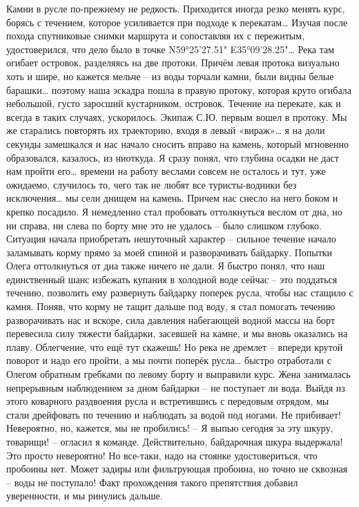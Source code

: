 Камни в русле по-прежнему не редкость. Приходится иногда резко менять курс, борясь с течением, которое усиливается при подходе к перекатам… Изучая после похода спутниковые снимки маршрута и сопоставляя их с пережитым, удостоверился, что дело было в точке N59°25'27.51" E35°09'28.25"… Река там огибает островок, разделяясь на две протоки. Причём левая протока визуально хоть и шире, но кажется мельче – из воды торчали камни, были видны белые барашки… поэтому наша эскадра пошла в правую протоку, которая круто огибала небольшой, густо заросший кустарником, островок. Течение на перекате, как и всегда в таких случаях, ускорилось. Экипаж С.Ю. первым вошел в протоку. Мы же старались повторять их траекторию, входя в левый «вираж»… я на доли секунды замешкался и нас начало сносить вправо на камень, который мгновенно образовался, казалось, из ниоткуда. Я сразу понял, что глубина осадки не даст нам пройти его… времени на работу веслами совсем не осталось и тут, уже ожидаемо, случилось то, чего так не любят все туристы-водники без исключения… мы сели днищем на камень. Причем нас снесло на него боком и крепко посадило. Я немедленно стал пробовать оттолкнуться веслом от дна, но ни справа, ни слева по борту мне это не удалось – было слишком глубоко. Ситуация начала приобретать нешуточный характер – сильное течение начало заламывать корму прямо за моей спиной и разворачивать байдарку. Попытки Олега оттолкнуться от дна также ничего не дали. Я быстро понял, что наш единственный шанс избежать купания в холодной воде сейчас – это поддаться течению, позволить ему развернуть байдарку поперек русла, чтобы нас стащило с камня. Поняв, что корму не тащит дальше под воду, я стал помогать течению разворачивать нас и вскоре, сила давления набегающей водной массы на борт перевесила силу тяжести байдарки, засевшей на камне, и мы вновь оказались на плаву. Облегчение, что ещё тут скажешь! Но река не дремлет – впереди крутой поворот и надо его пройти, а мы почти поперёк русла… быстро отработали с Олегом обратным гребками по левому борту и выправили курс. Жена занималась непрерывным наблюдением за дном байдарки – не поступает ли вода. Выйдя из этого коварного раздвоения русла и встретившись с передовым отрядом, мы стали дрейфовать по течению и наблюдать за водой под ногами. Не прибивает! Невероятно, но, кажется, мы не пробились! 
– Я выпью сегодня за эту шкуру, товарищи! – огласил я команде. 
Действительно, байдарочная шкура выдержала! Это просто невероятно! Но все-таки, надо на стоянке удостовериться, что пробоины нет. Может задиры или фильтрующая пробоина, но точно не сквозная – воды не поступало! Факт прохождения такого препятствия добавил уверенности, и мы ринулись дальше.
